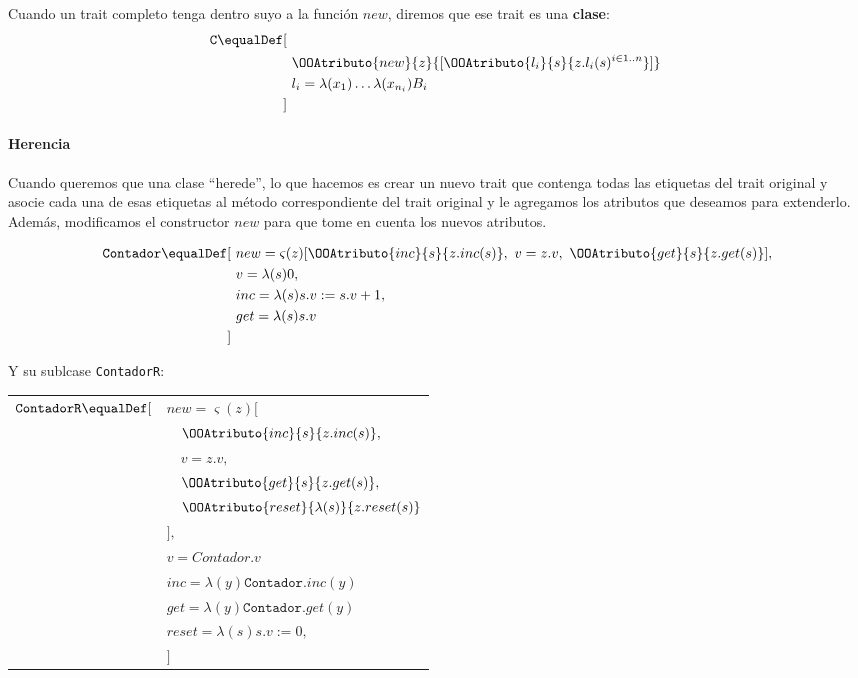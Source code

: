 \newpage
Cuando un trait completo tenga dentro suyo a la función $new$, diremos que ese trait es una \textbf{clase}:
\begin{align*}
\texttt{C}\equalDef [~& \\ &\OOAtributo{new}{z}{[\OOAtributo{l_i}{s}{z.l_i(s)^{i\in 1..n}}]}~\\
&l_i = \lambda(x_{1})\dots\lambda(x_{n_i})B_i \\
]~&
\end{align*}
\paragraph{Herencia} Cuando queremos que una clase ``herede'', lo que hacemos es crear un nuevo trait que contenga todas las etiquetas del trait original y asocie cada una de esas etiquetas al método correspondiente del trait original y le agregamos los atributos que deseamos para extenderlo. Además, modificamos el constructor $new$ para que tome en cuenta los nuevos atributos.

\vspace*{5mm}
\begin{align*}
\texttt{Contador}\equalDef [~&
new = \varsigma(z)[\OOAtributo{inc}{s}{z.inc(s)},~v = z.v,~ \OOAtributo{get}{s}{z.get(s)} ], \\
 & v = \lambda(s)0, \\
 & inc = \lambda(s) s.v := s.v + 1, \\
 & get = \lambda(s) s.v \\
 ]~&  \\
\end{align*}

Y su sublcase \texttt{ContadorR}:

\vspace*{5mm}
\begin{tabular}{ll}
$\texttt{ContadorR}\equalDef [$ &
$new = \varsigma(z)[$
\\ & $\quad\OOAtributo{inc}{s}{z.inc(s)},$ \\ 
 & $\quad v = z.v,$ \\
 & $\quad \OOAtributo{get}{s}{z.get(s)},$ \\
 & $\quad \OOAtributo{reset}{\lambda(s)}{z.reset(s)} $ \\
 & $ ],$ \\
& $v = Contador.v$ \\
& $inc = \lambda(y)\texttt{Contador}.inc(y)$ \\
& $get = \lambda(y)\texttt{Contador}.get(y)$ \\
& $reset = \lambda(s) s.v := 0,$ \\
& $]$ \\
\end{tabular}


